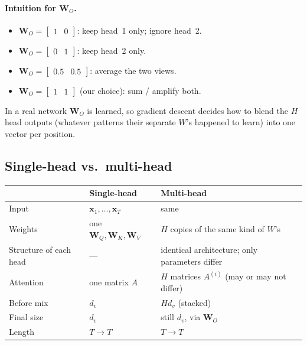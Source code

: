 \documentclass[11pt]{article}
\begin{document}
\paragraph{Intuition for \(\mathbf{W}_O\).}
\begin{itemize}[leftmargin=*]
  \item \(\mathbf{W}_O=\begin{bmatrix}1&0\end{bmatrix}\):
        keep head~1 only; ignore head~2.
  \item \(\mathbf{W}_O=\begin{bmatrix}0&1\end{bmatrix}\):
        keep head~2 only.
  \item \(\mathbf{W}_O=\begin{bmatrix}0.5&0.5\end{bmatrix}\):
        average the two views.
  \item \(\mathbf{W}_O=\begin{bmatrix}1&1\end{bmatrix}\) (our choice):
        sum / amplify both.
\end{itemize}
In a real network \(\mathbf{W}_O\) is learned, so gradient descent decides
how to blend the \(H\) head outputs (whatever patterns their separate
\(W\)'s happened to learn) into one vector per position.

\subsection{Single-head vs.\ multi-head}

\begin{center}
\begin{tabular}{@{}lll@{}}
\toprule
 & Single-head & Multi-head \\
\midrule
Input
  & \(\mathbf{x}_1,\ldots,\mathbf{x}_T\)
  & same \\
Weights
  & one \(\mathbf{W}_Q,\mathbf{W}_K,\mathbf{W}_V\)
  & \(H\) copies of the same kind of \(W\)'s \\
Structure of each head
  & ---
  & identical architecture; only parameters differ \\
Attention
  & one matrix \(A\)
  & \(H\) matrices \(A^{(i)}\) (may or may not differ) \\
Before mix
  & \(d_v\)
  & \(H d_v\) (stacked) \\
Final size
  & \(d_v\)
  & still \(d_v\), via \(\mathbf{W}_O\) \\
Length
  & \(T\to T\)
  & \(T\to T\) \\
\bottomrule
\end{tabular}
\end{center}
\end{document}
